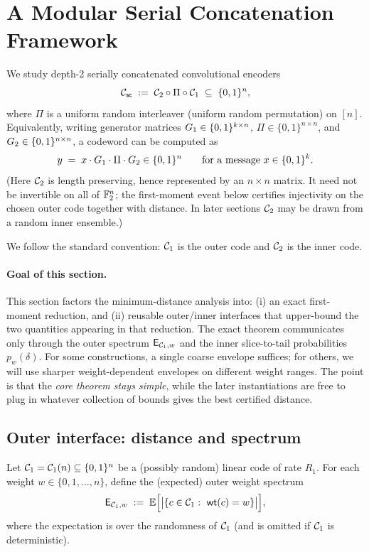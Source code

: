 \section{A Modular Serial Concatenation Framework}
\label{sec:sc-framework}

We study depth-2 serially concatenated convolutional encoders
\[
{\mathcal{C}_{\mathsf{sc}}} \;:=\; {\mathcal{C}_2} \circ \Pi \circ {\mathcal{C}_1} \;\subseteq\; \{0,1\}^n,
\]
where \(\Pi\) is a uniform random interleaver (uniform random permutation) on \([n]\).
Equivalently, writing generator matrices \({G_1}\in\{0,1\}^{k\times n}\), \(\Pi\in\{0,1\}^{n\times n}\),
and \({G_2}\in\{0,1\}^{n\times n}\), a codeword can be computed as
\[
y \;=\; x\cdot {G_1} \cdot \Pi \cdot {G_2} \in \{0,1\}^n
\qquad\text{for a message }x\in\{0,1\}^k.
\]
(Here \({\mathcal{C}_2}\) is length preserving, hence represented by an \(n\times n\)
matrix.  It need not be invertible on all of \(\mathbb{F}_2^n\); the first-moment event
below certifies injectivity on the chosen outer code together with distance.  In
later sections \({\mathcal{C}_2}\) may be drawn from a random inner ensemble.)

We follow the standard convention: \({\mathcal{C}_1}\) is the outer code and \({\mathcal{C}_2}\) is the inner code.

\paragraph{Goal of this section.}
This section factors the minimum-distance analysis into:
(i) an exact first-moment reduction, and
(ii) reusable outer/inner interfaces that upper-bound the two quantities appearing in that reduction.
The exact theorem communicates only through the outer spectrum \(\mathsf{E}_{{\mathcal{C}_1},w}\) and the inner slice-to-tail probabilities
\(p_w(\delta)\).
For some constructions, a single coarse envelope suffices; for others, we will use sharper weight-dependent envelopes on
different weight ranges.
The point is that the \emph{core theorem stays simple}, while the later instantiations are free to plug in whatever
collection of bounds gives the best certified distance.

\subsection{Outer interface: distance and spectrum}
\label{sec:outer-interface}

Let \({\mathcal{C}_1}={\mathcal{C}_1}(n)\subseteq\{0,1\}^n\) be a (possibly random) linear code of rate \(R_1\).
For each weight \(w\in\{0,1,\dots,n\}\), define the (expected) outer weight spectrum
\[
\mathsf{E}_{{\mathcal{C}_1},w} \;:=\; \mathbb{E}\Bigl[\bigl|\{c\in{\mathcal{C}_1}:\ \mathsf{wt}(c)=w\}\bigr|\Bigr],
\]
where the expectation is over the randomness of \({\mathcal{C}_1}\) (and is omitted if \({\mathcal{C}_1}\) is deterministic).

